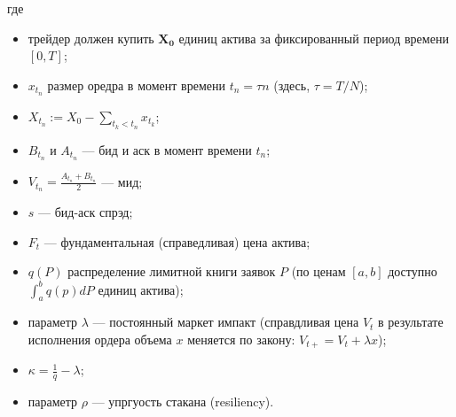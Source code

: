 где
\begin{itemize}
 \item трейдер должен купить $\mathbf{X_0}$ единиц актива за фиксированный период времени $[0,T]$;
 \item $x_{t_n}$ размер оредра в момент времени $t_n = \tau n$ (здесь, $\tau = T / N$); 
 \item $X_{t_n} := X_0 - \sum _{t_k < t_n} x_{t_k}$;
 \item $B_{t_n}$ и $A_{t_n}$ --- бид и аск в момент времени $t_n$; 
 \item $V_{t_n} = \frac{A_{t_n} + B_{t_n}}{2}$ --- мид; 
 \item $s$ --- бид-аск спрэд;
 \item $F_t$ --- фундаментальная (справедливая) цена актива;
 \item $q(P)$ распределение лимитной книги заявок $P$ (по ценам $[a, b]$ доступно $\int_a^b q(p) dP$ единиц актива);
 \item параметр $\lambda$ --- постоянный маркет импакт (справдливая цена $V_t$ в результате исполнения ордера объема $x$ меняется по закону: $V_{t+} = V_t + \lambda x$);
  \item $\kappa = \frac{1}{q} - \lambda $;
 \item параметр $\rho$ --- упргуость стакана (resiliency).
\end{itemize}

